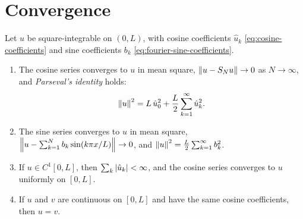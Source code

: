 \section{Convergence}\label{sec:fourier-convergence}

\begin{theorem}\label{thm:cosine-series}
Let $u$ be square-integrable on $(0,L)$, with cosine coefficients $\hat u_k$
\eqref{eq:cosine-coefficients} and sine coefficients $b_k$
\eqref{eq:fourier-sine-coefficients}.
\begin{enumerate}[label=(\alph*)]
  \item The cosine series converges to $u$ in mean square, $\left\lVert u-S_Nu\right\rVert\to0$ as
        $N\to\infty$, and \emph{Parseval's identity} holds:
        \begin{equation}\label{eq:parseval}
          \left\lVert u\right\rVert^2 = L\,\hat u_0^2 + \frac L2\sum_{k=1}^\infty\hat u_k^2 .
        \end{equation}
  \item The sine series converges to $u$ in mean square,
        $\left\lVert u-\sum_{k=1}^Nb_k\sin(k\pi x/L)\right\rVert\to0$, and
        $\left\lVert u\right\rVert^2=\frac L2\sum_{k=1}^\infty b_k^2$.
  \item If $u\in C^1[0,L]$, then $\sum_k\left\lvert \hat u_k\right\rvert<\infty$, and the cosine series
        converges to $u$ uniformly on $[0,L]$.
  \item If $u$ and $v$ are continuous on $[0,L]$ and have the same cosine
        coefficients, then $u=v$.
\end{enumerate}
\end{theorem}

